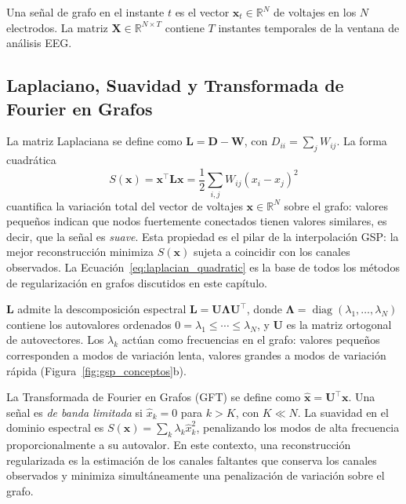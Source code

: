 Una señal de grafo en el instante $t$ es el vector $\mathbf{x}_t \in \mathbb{R}^N$ de voltajes en los $N$ electrodos. La matriz $\mathbf{X} \in \mathbb{R}^{N \times T}$ contiene $T$ instantes temporales de la ventana de análisis EEG.

\subsection{Laplaciano, Suavidad y Transformada de Fourier en Grafos}

La matriz Laplaciana se define como $\mathbf{L} = \mathbf{D} - \mathbf{W}$, con $D_{ii} = \sum_j W_{ij}$. La forma cuadrática
\begin{equation}
S(\mathbf{x}) = \mathbf{x}^\top \mathbf{L} \mathbf{x} = \frac{1}{2} \sum_{i,j} W_{ij} (x_i - x_j)^2
\label{eq:laplacian_quadratic}
\end{equation}
cuantifica la variación total del vector de voltajes $\mathbf{x} \in \mathbb{R}^N$ sobre el grafo: valores pequeños indican que nodos fuertemente conectados tienen valores similares, es decir, que la señal es \textit{suave}. Esta propiedad es el pilar de la interpolación GSP: la mejor reconstrucción minimiza $S(\mathbf{x})$ sujeta a coincidir con los canales observados. La Ecuación~\ref{eq:laplacian_quadratic} es la base de todos los métodos de regularización en grafos discutidos en este capítulo.

$\mathbf{L}$ admite la descomposición espectral $\mathbf{L} = \mathbf{U} \boldsymbol{\Lambda} \mathbf{U}^\top$, donde $\boldsymbol{\Lambda} = \operatorname{diag}(\lambda_1, \dots, \lambda_N)$ contiene los autovalores ordenados $0 = \lambda_1 \leq \cdots \leq \lambda_N$, y $\mathbf{U}$ es la matriz ortogonal de autovectores. Los $\lambda_k$ actúan como frecuencias en el grafo: valores pequeños corresponden a modos de variación lenta, valores grandes a modos de variación rápida (Figura~\ref{fig:gsp_conceptos}b).

La Transformada de Fourier en Grafos (GFT) se define como $\hat{\mathbf{x}} = \mathbf{U}^\top \mathbf{x}$. Una señal es \textit{de banda limitada} si $\hat{x}_k = 0$ para $k > K$, con $K \ll N$. La suavidad en el dominio espectral es $S(\mathbf{x}) = \sum_k \lambda_k \hat{x}_k^2$, penalizando los modos de alta frecuencia proporcionalmente a su autovalor. En este contexto, una reconstrucción regularizada es la estimación de los canales faltantes que conserva los canales observados y minimiza simultáneamente una penalización de variación sobre el grafo.

